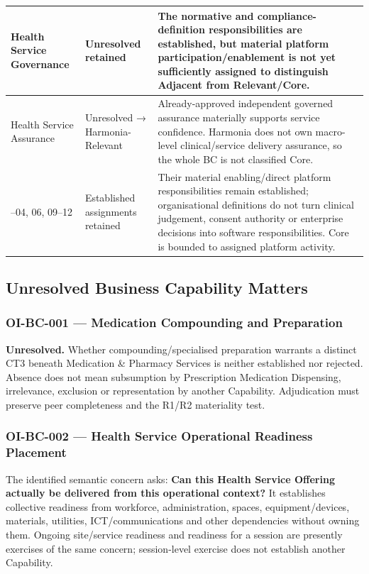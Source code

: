 \begin{longtable}{|>{\raggedright\arraybackslash}p{0.24\TableWidth}|>{\raggedright\arraybackslash}p{0.33\TableWidth}|>{\raggedright\arraybackslash}p{0.43\TableWidth}|}
17 Health Service Governance & Unresolved retained & The normative and compliance-definition responsibilities are established, but material platform participation/\allowbreak{}enablement is not yet sufficiently assigned to distinguish Adjacent from Relevant/\allowbreak{}Core.\\\hline
18 Health Service Assurance & Unresolved → Harmonia-Relevant & Already-approved independent governed assurance materially supports service confidence. Harmonia does not own macro-level clinical/\allowbreak{}service delivery assurance, so the whole BC is not classified Core.\\\hline
01–04, 06, 09–12 & Established assignments retained & Their material enabling/\allowbreak{}direct platform responsibilities remain established; organisational definitions do not turn clinical judgement, consent authority or enterprise decisions into software responsibilities. Core is bounded to assigned platform activity.\\\hline
\end{longtable}\endgroup
{}\label{rad:business:1182}
\subsection*{Unresolved Business Capability Matters}
\label{rad:business:1184}
\subsubsection*{OI-BC-001 — Medication Compounding and Preparation}
\label{rad:business:1186}

\textbf{Unresolved.} Whether compounding/\allowbreak{}specialised preparation warrants a distinct CT3 beneath Medication \& Pharmacy Services is neither established nor rejected. Absence does not mean subsumption by Prescription Medication Dispensing, irrelevance, exclusion or representation by another Capability. Adjudication must preserve peer completeness and the R1/\allowbreak{}R2 materiality test.

\label{rad:business:1192}
\subsubsection*{OI-BC-002 — Health Service Operational Readiness Placement}
\label{rad:business:1194}

The identified semantic concern asks: \textbf{Can this Health Service Offering actually be delivered from this operational context?} It establishes collective readiness from workforce, administration, spaces, equipment/\allowbreak{}devices, materials, utilities, ICT/\allowbreak{}communications and other dependencies without owning them. Ongoing site/\allowbreak{}service readiness and readiness for a session are presently exercises of the same concern; session-level exercise does not establish another Capability.

